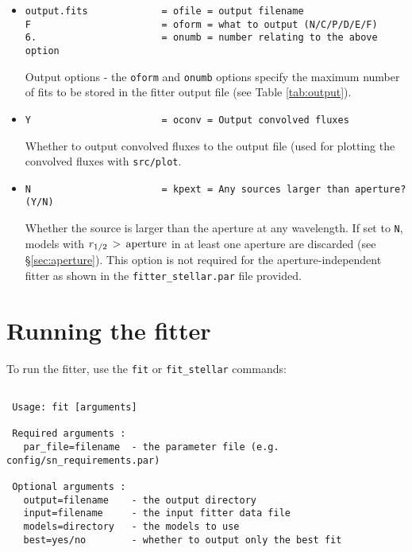 \documentclass[letterpaper,11pt]{report}
\begin{document}
\begin{itemize}
\item
\begin{verbatim}
output.fits             = ofile = output filename
F                       = oform = what to output (N/C/P/D/E/F)   
6.                      = onumb = number relating to the above option
\end{verbatim}
Output options - the \texttt{oform} and \texttt{onumb} options specify the maximum number of fits to be stored in the fitter output file (see Table \ref{tab:output}).

\item
\begin{verbatim}
Y                       = oconv = Output convolved fluxes
\end{verbatim}
Whether to output convolved fluxes to the output file (used for plotting the convolved fluxes with \texttt{src/plot}.

\item
\begin{verbatim}
N                       = kpext = Any sources larger than aperture? (Y/N)
\end{verbatim}
Whether the source is larger than the aperture at any wavelength. If set to \texttt{N}, models with $r_{1/2}\,>\,{\rm aperture}$ in at least one aperture are discarded (see \S\ref{sec:aperture}). This option is not required for the aperture-independent fitter as shown in the \texttt{fitter\_stellar.par} file provided. 

\end{itemize}

\chapter{Running the fitter}
\label{s:fit}
To run the fitter, use the \texttt{fit} or \texttt{fit\_stellar} commands:

\begin{Verbatim}[frame=single,label=Syntax]

 Usage: fit [arguments]
 
 Required arguments :
   par_file=filename  - the parameter file (e.g. config/sn_requirements.par)
 
 Optional arguments :
   output=filename    - the output directory
   input=filename     - the input fitter data file
   models=directory   - the models to use 
   best=yes/no        - whether to output only the best fit
   
\end{Verbatim}
\end{document}
